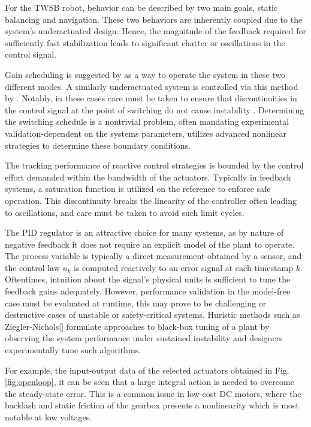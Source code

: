         For the TWSB robot, behavior can be described by two main goals, static balancing and navigation.
        These two behaviors are inherently coupled due to the system's underactuated design. Hence, the 
        magnitude of the feedback required for sufficiently fast stabilization leads to significant chatter or oscillations 
        in the control signal.

        Gain scheduling is suggested by \cite{refvem2019design}
        as a way to operate the system in these two different modes. A similarly underactuated system is controlled via this 
        method by \cite{wanggain}. Notably, in these cases care must be taken to ensure 
        that discontinuities in the control signal at the point of switching do not cause instability \cite{hespanha2002switching}.
        Determining the switching schedule is a nontrivial problem, often mandating experimental validation-dependent 
        on the systems parameters, \cite{RoboLimbo} utilizes advanced nonlinear strategies to determine these
        boundary conditions.

        The tracking performance of reactive control strategies is bounded by the control effort 
        demanded within the bandwidth of the actuators. Typically in feedback systems, a saturation function 
        is utilized on the reference to enforce safe operation. This discontinuity breaks the linearity of the 
        controller often leading to oscillations, and care must be taken to avoid such limit cycles.
            
        The PID regulator is an attractive choice for many systems, as by nature of negative feedback it does not 
        require an explicit model of the plant to operate. The process variable is typically a direct measurement 
        obtained by a sensor, and the control law $u_k$ is computed reactively to an error signal at each timestamp $k$.
        Oftentimes, intuition about the signal's physical units is sufficient to tune the feedback gains adequately. 
        However, performance validation in the model-free case must be evaluated at runtime, this may prove to be 
        challenging or destructive cases of unstable or safety-critical systems. Huristic methods such as Ziegler-Nichols[]
        formulate approaches to black-box tuning of a plant by observing the system 
        performance under sustained instability and designers experimentally tune such algorithms.
    
        For example, the input-output data of the selected actuators obtained in Fig.\ref{fig:openloop}, 
        it can be seen that a large integral action is needed to overcome the steady-state error.
        This is a common issue in low-cost DC motors, where the backlash and static friction of the gearbox presents 
        a nonlinearity which is most notable at low voltages. 
    
